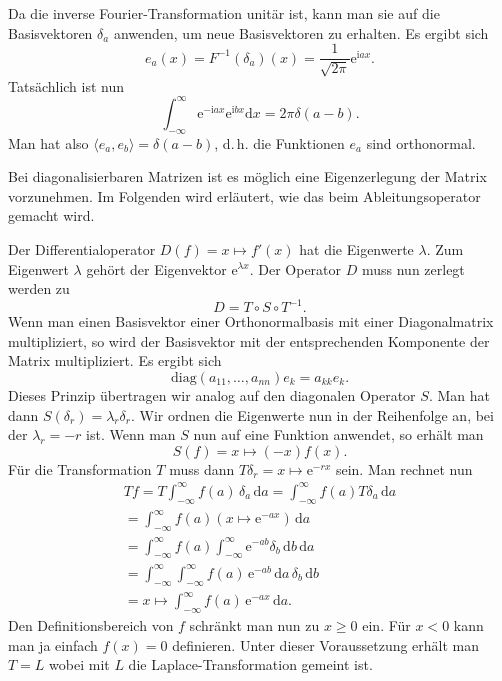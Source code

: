\documentclass[a4paper,10pt,fleqn,twocolumn,twoside]{article}
\numberwithin{equation}{section}
\newcommand{\ui}{\mathrm i}
\newcommand{\ee}{\mathrm e}
\begin{document}
Da die inverse Fourier-Transformation unitär ist, kann man sie auf
die Basisvektoren $\delta_a$ anwenden, um neue Basisvektoren zu
erhalten. Es ergibt sich
\begin{equation}
e_a(x) = F^{-1}(\delta_a)(x) = \frac{1}{\sqrt{2\pi}}\ee^{\ui ax}.
\end{equation}
Tatsächlich ist nun
\begin{equation}
\int_{-\infty}^{\infty} \ee^{-\ui ax}\ee^{\ui bx}\mathrm dx
= 2\pi\delta(a-b).
\end{equation}
Man hat also $\langle e_a,e_b\rangle = \delta(a-b)$, d.\,h. die
Funktionen $e_a$ sind orthonormal.

Bei diagonalisierbaren Matrizen ist es möglich eine Eigenzerlegung
der Matrix vorzunehmen. Im Folgenden wird erläutert, wie das beim
Ableitungsoperator gemacht wird.

Der Differentialoperator $D(f)=x\mapsto f'(x)$ hat die
Eigenwerte $\lambda$. Zum Eigenwert $\lambda$ gehört der
Eigenvektor $\ee^{\lambda x}$. Der Operator $D$ muss nun zerlegt
werden zu%
\begin{equation}
D=T\circ S\circ T^{-1}.
\end{equation}
Wenn man einen Basisvektor einer Orthonormalbasis mit einer
Diagonalmatrix multipliziert, so wird der Basisvektor mit der
entsprechenden Komponente der Matrix multipliziert. Es ergibt sich
\begin{equation}
\mathrm{diag}(a_{11},\ldots,a_{nn})e_k = a_{kk}e_k.
\end{equation}
Dieses Prinzip übertragen wir analog auf den diagonalen
Operator $S$. Man hat dann $S(\delta_r) = \lambda_r \delta_r$.
Wir ordnen die Eigenwerte nun in der Reihenfolge an, bei der
$\lambda_r=-r$ ist. Wenn man $S$ nun auf eine Funktion anwendet,
so erhält man
\begin{equation}
S(f) = x\mapsto (-x)f(x).
\end{equation}
Für die Transformation $T$ muss dann
$T\delta_r = x\mapsto \ee^{-rx}$ sein.
Man rechnet nun
\begin{gather*}
Tf = T\int_{-\infty}^{\infty} f(a)\,\delta_a\,\mathrm da
= \int_{-\infty}^{\infty} f(a)T\delta_a\,\mathrm da\\
= \int_{-\infty}^{\infty} f(a)(x\mapsto \ee^{-ax})\,\mathrm da\\
= \int_{-\infty}^{\infty} f(a)\int_{-\infty}^{\infty} \ee^{-ab}\delta_b
\,\mathrm db\,\mathrm da\\
= \int_{-\infty}^{\infty}\int_{-\infty}^{\infty} f(a)\,\ee^{-ab}
\,\mathrm da\,\delta_b\,\mathrm db\\
= x\mapsto \int_{-\infty}^{\infty} f(a)\,\ee^{-ax}\,\mathrm da.
\end{gather*}
Den Definitionsbereich von $f$ schränkt man nun zu $x\ge 0$ ein.
Für $x<0$ kann man ja einfach $f(x)=0$ definieren. Unter dieser
Voraussetzung erhält man $T=L$ wobei mit $L$ die
Laplace-Transformation gemeint ist.
\end{document}
